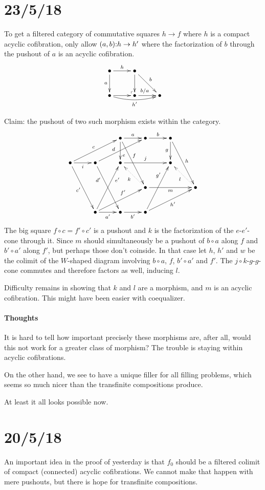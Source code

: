 \documentclass[csh.tex]{subfiles}
\makeatletter
\newcommand\pushout{\ar@{}[dr]|(.9)\ulcorner}
\makeatother
\begin{document}
\section{23/5/18}
To get a filtered category of commutative squares $h\to f$ where $h$ is a compact acyclic cofibration, only allow $(a,b)\mathord : h\to h'$ where the factorization of $b$ through the pushout of $a$ is an acyclic cofibration.
\[\xymatrix{
\bullet \ar[r]^h\ar[d]_a\pushout & \bullet\ar[d]\ar[dr]^b \\
\bullet \ar[r]\ar@/_/[rr]_{h'} & \bullet \ar[r]^(.4){b/a} & \bullet
}\]

Claim: the pushout of two such morphism exists within the category.
\[\xymatrix{
&& \bullet \ar[r]^a\ar[ddr]^(.4)f\ar[d]^(.7)e & \bullet\ar[r]^b & \bullet \ar[ddr]^h \ar[d]_g\\
\bullet\ar[r]_i\ar[urr]^c\ar[ddr]_{c'} &\bullet\ar[urr]^(.4)d\ar[ddr]_(.3){d'} &
\bullet\ar[rr]^j && \bullet\\
&&&\bullet\ar[rr]_m\ar@{.>}[ul]^k &&\bullet\ar@{.>}[ul]^l \\
& \bullet \ar[r]_{a'}\ar[urr]^(.6){f'}\ar[uur]_(.7){e'} & \bullet\ar[r]_{b'} & \bullet \ar[urr]_{h'}\ar[uur]^(.7){g'}
}\]
The big square $f\circ c = f'\circ c'$ is a pushout and $k$ is the factorization of the $e$-$e'$-cone through it. Since $m$ should simultaneously be a pushout of $b\circ a$ along $f$ and $b'\circ a'$ along $f'$, but perhaps those don't coinside. In that case let $h$, $h'$ and $w$ be the colimit of the $W$-shaped diagram involving $b\circ a$, $f$, $b'\circ a'$ and $f'$. The $j\circ k$-$g$-$g$-cone commutes and therefore factors as well, inducing $l$. 

Difficulty remains in showing that $k$ and $l$ are a morphism, and $m$ is an acyclic cofibration. This might have been easier with coequalizer.

\paragraph{Thoughts}
It is hard to tell how important precisely these morphisms are, after all, would this not work for a greater class of morphism? The trouble is staying within acyclic cofibrations.

On the other hand, we see to have a unique filler for all filling problems, which seems so much nicer than the transfinite compositions produce.

At least it all looks possible now.

\section{20/5/18}
An important idea in the proof of yesterday is that $f_0$ should be a filtered colimit of compact (connected) acyclic cofibrations. We cannot make that happen with mere pushouts, but there is hope for transfinite compositions.
\end{document}
